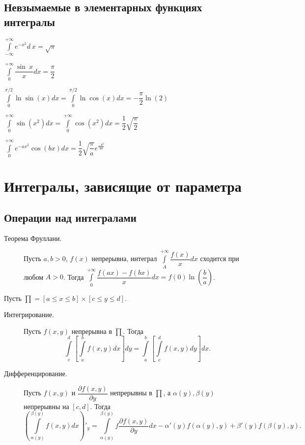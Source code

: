 \documentclass[a4paper,12pt]{scrartcl}
\begin{document}
\subsection{Невзымаемые в элементарных функциях интегралы}
\begin{description}
 \item[Интеграл Пуассона.] $\int\limits_{-\infty}^{+\infty}e^{-x^2}d\ x = \sqrt{\pi}$
 \item[Интеграл Дирихле.] $\int\limits_{0}^{+\infty}\dfrac{\sin\ x}{x}dx = \dfrac{\pi}{2}$
 \item[Интеграл Эйлера.] $\int\limits_{0}^{\pi/2}\ln\sin(x)dx = \int\limits_{0}^{\pi/2}\ln\cos(x)dx = -\dfrac{\pi}{2}\ln(2)$
 \item[Интеграл Френеля.] $\int\limits_{0}^{+\infty}\sin(x^2)dx = \int\limits_{0}^{+\infty}\cos(x^2)dx = \dfrac{1}{2}\sqrt{\dfrac{\pi}{2}}$
\item $\int\limits_{0}^{+\infty}e^{-ax^2}\cos(bx)dx = \dfrac{1}{2}\sqrt{\dfrac{\pi}{a}}e^{\frac{-b^2}{4a}}$
\end{description}
\section{Интегралы, зависящие от параметра}
\subsection{Операции над интегралами}
\begin{description}
 \item[Теорема Фруллани.] Пусть $a,b > 0$, $f(x)$ непрерывна, интеграл $\int\limits_{A}^{+\infty}\dfrac{f(x)}{x}dx$ сходится при любом $A > 0$. Тогда $\int\limits_{0}^{+\infty}\dfrac{f(ax) - f(bx)}{x}dx = f(0)\ln\left(\dfrac{b}{a}\right)$.
\end{description}
Пусть $\prod = [a \leqslant x \leqslant b]\times[c \leqslant y \leqslant d]$.
\begin{description}
 \item[Интегрирование.] Пусть $f(x,y)$ непрерывна в $\prod$. Тогда 
$$\int\limits_c^d\left[\int\limits_a^bf(x,y)dx\right]dy =
\int\limits_a^b\left[\int\limits_c^df(x,y)dy\right]dx.$$
 \item[Дифференцирование.] Пусть $f(x,y)$ и $\dfrac{\partial f(x,y)}{\partial y}$ непрерывны в $\prod$, а $\alpha(y),\beta(y)$ непрерывны на $[c,d]$. Тогда 
$$ \left(\int\limits_{\alpha(y)}^{\beta(y)}f(x,y)dx\right)'_y = \int\limits_{\alpha(y)}^{\beta(y)}f\dfrac{\partial f(x,y)}{\partial y}dx - \alpha'(y)f(\alpha(y),y) + \beta'(y)f(\beta(y),y).$$
\end{description}
\end{document}
